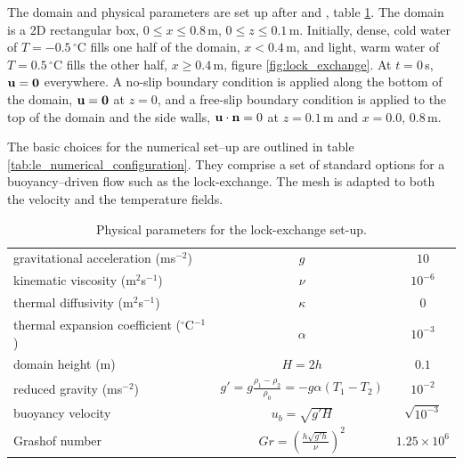 The domain and physical parameters are set up after \cite{fringer_06} and \cite{hartel_00}, table \ref{tab:le_physical_parameters}. The domain is a 2D rectangular box, $0\leq x \leq 0.8\,$m, $0 \leq z \leq 0.1\,$m. Initially, dense, cold water of $T = -0.5\,^\circ$C fills one half of the domain, $x<0.4\,$m, and light, warm water of $T = 0.5\,^\circ$C fills the other half, $x\geq0.4\,$m, figure \ref{fig:lock_exchange}. At $t=0\,$s, ${\bf u} = {\bf 0}$ everywhere. A no-slip boundary condition is applied along the bottom of the domain, ${\bf u = 0}$ at $z=0$, and a free-slip boundary condition is applied to the top of the domain and the side walls, ${\bf u\cdot\bf n} = 0$ at $z = 0.1\,$m and $x = 0.0,\, 0.8\,$m.

The basic choices for the numerical set--up are outlined in table \ref{tab:le_numerical_configuration}. They comprise a set of standard options for a buoyancy--driven flow such as the lock-exchange. The mesh is adapted to both the velocity and the temperature fields.  

\begin{table}[th]
\centering
\begin{tabular}[h]{l   c  c }  \hline
gravitational acceleration (ms$^{-2}$)			& $g$ 								& $10$  \\
kinematic viscosity (m$^2$s$^{-1}$)			& $\nu$								& $10^{-6}$  \\
thermal diffusivity (m$^2$s$^{-1}$)					& $\kappa$ 					& 0  \\
thermal expansion coefficient ($^\circ$C$^{-1}$)	& $\alpha$ 							& $10^{-3}$ \\ 
domain height (m)					& $H = 2h$							& $0.1$ \\ %
reduced gravity	(ms$^{-2}$)				& $g' = g\frac{\rho_1 - \rho_2}{\rho_0} = -g\alpha (T_1 - T_2)$	& $10^{-2}$  \\
buoyancy velocity					& $u_b = \sqrt{g'H}$ 						& $\sqrt{10^{-3}}$ \\
Grashof number						& $Gr = \left( \frac{h \sqrt{g'h}}{\nu} \right)^2$ 		& $1.25 \times 10^{6}$\\ \hline
\end{tabular}
\caption{Physical parameters for the lock-exchange set-up.}
\label{tab:le_physical_parameters}
\end{table}

